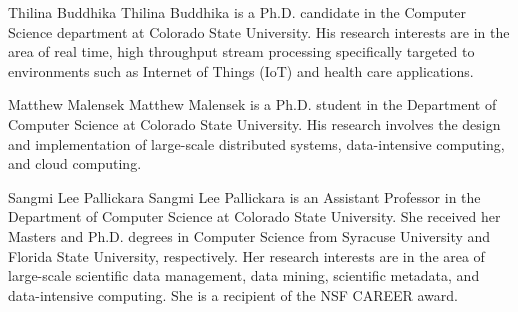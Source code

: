 \documentclass[9pt,journal,compsoc]{IEEEtran}
\begin{document}


\vspace*{-4\baselineskip}
\begin{IEEEbiography}{Thilina Buddhika}
Thilina Buddhika is a Ph.D. candidate in the Computer Science department at Colorado State University.  His research interests are in the area of real time, high throughput stream processing specifically targeted to environments such as Internet of Things (IoT) and health care applications.
\end{IEEEbiography}
\vspace{-2cm}
\begin{IEEEbiography}{Matthew Malensek}
Matthew Malensek is a Ph.D. student in the Department of Computer Science at Colorado State University. His research involves the design and implementation of large-scale distributed systems, data-intensive computing, and cloud computing.
\end{IEEEbiography}
%
\vspace{-2cm}
\begin{IEEEbiography}{Sangmi Lee Pallickara}
Sangmi Lee Pallickara is an Assistant Professor in the Department of Computer Science at Colorado State University. She received her Masters and Ph.D. degrees in Computer Science from Syracuse University and Florida State University, respectively. Her research interests are in the area of large-scale scientific data management, data mining, scientific metadata, and data-intensive computing. She is a recipient of the NSF CAREER award.
\end{IEEEbiography}
\end{document}
